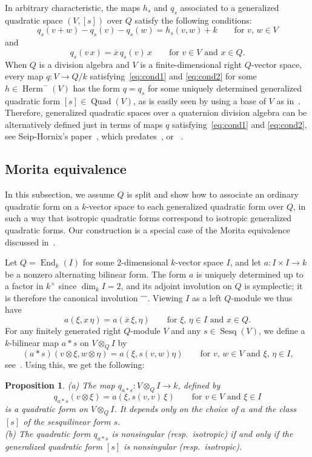 \documentclass{amsart}
\newcommand{\invo}{\overline{\rule{2.5mm}{0mm}\rule{0mm}{4pt}}}
\DeclareMathOperator{\Sesq}{Sesq}
\DeclareMathOperator{\Quad}{Quad}
\DeclareMathOperator{\Herm}{Herm}
\DeclareMathOperator{\End}{End}
\newtheorem{prop}{Proposition}[section]
\theoremstyle{remark}
\begin{document}
In arbitrary characteristic, the maps $h_s$ and $q_s$ associated to a
generalized quadratic space $(V,[s])$ over $Q$ satisfy the following conditions:
\begin{equation}
  \label{eq:cond1}
  q_s(v+w)-q_s(v)-q_s(w) = h_s(v,w)+k\qquad\text{for $v$, $w\in V$}
\end{equation}
and
\begin{equation}
  \label{eq:cond2}
  q_s(v\,x) = \overline x\,q_s(v)\,x \qquad\text{for $v\in V$ and
    $x\in Q$.}
\end{equation}
When $Q$ is a division algebra and $V$ is a finite-dimensional right
$Q$-vector space, every map $q\colon V\to Q/k$
satisfying~\eqref{eq:cond1} and \eqref{eq:cond2} for some
$h\in\Herm^-(V)$ has the form $q=q_s$ for some uniquely 
determined generalized quadratic form $[s]\in\Quad(V)$, as is easily
seen by using a base of $V$ as in~\cite[\S\,8.2]{TitsBN}. Therefore,
generalized quadratic spaces over a quaternion division algebra can
be 
alternatively defined just in terms of maps $q$
satisfying~\eqref{eq:cond1} and \eqref{eq:cond2}, see
Seip-Hornix's paper~\cite{SH}, which predates~\cite{Tits}, or ~\cite[\S\,11]{TW}. 

\subsection{Morita equivalence}
\label{subsec:Morita}

In this subsection, we assume $Q$ is split and show how to associate
an ordinary quadratic form on a $k$-vector space to each generalized
quadratic form over $Q$, in such a way that isotropic quadratic forms
correspond to isotropic generalized quadratic forms. Our construction
is a special case of the Morita equivalence discussed
in~\cite[I(9.4)]{Knus}.

Let $Q=\End_k(I)$ for some $2$-dimensional $k$-vector space $I$, and
let $a\colon I\times I\to k$ be a nonzero alternating bilinear
form. The form $a$ is uniquely determined up to a factor in $k^\times$
since $\dim_kI=2$, and its adjoint involution on $Q$ is symplectic; it
is therefore the canonical involution $\invo$. Viewing $I$ as a left
$Q$-module we thus have
\[
  a(\xi,x\,\eta)=a(\overline x\,\xi,\eta) \qquad\text{for $\xi$, $\eta\in I$ and
    $x\in Q$.}
\]
For any finitely generated right $Q$-module $V$ and any
$s\in\Sesq(V)$, we define a $k$-bilinear map $a*s$ on $V\otimes_QI$
by 
\[
  (a*s)(v\otimes\xi, w\otimes\eta) = a(\xi, s(v,w)\eta)
  \qquad\text{for $v$, $w\in V$ and $\xi$, $\eta\in I$,}
\]
see~\cite[I.8]{Knus}. Using this, we get the following: 
\begin{prop}
\label{prop:nonsing}
(a) The map $q_{a*s}\colon V\otimes_QI\to k$, defined by 
\[
  q_{a*s}(v\otimes\xi) = a(\xi, s(v,v)\,\xi)
  \qquad\text{for $v\in V$ and $\xi\in I$}
\]
is a quadratic form on $V\otimes_QI$. 
It depends only on the choice of $a$ and the class $[s]$ of the sesquilinear form $s$. \\
(b) The quadratic form $q_{a*s}$ is nonsingular (resp.\ isotropic) if
  and only if the generalized quadratic form $[s]$ is nonsingular
  (resp.\ isotropic).
\end{prop}
\end{document}
